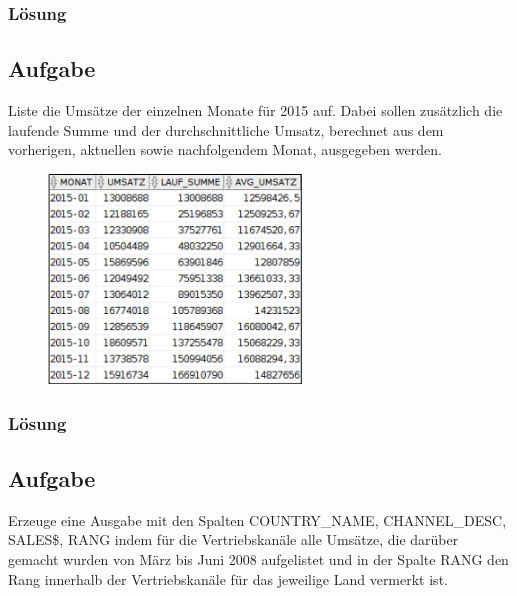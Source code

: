 \subsubsection*{Lösung}
\label{subsubsec:uebung_07.aufgabe_03.loesung}


\label{subsec:uebung_07.aufgabe_04}
\subsection{Aufgabe}
Liste die Umsätze der einzelnen Monate für 2015 auf. Dabei sollen zusätzlich die laufende Summe und der durchschnittliche Umsatz, berechnet aus dem vorherigen, aktuellen sowie nachfolgendem Monat, ausgegeben werden.

\begin{figure}[H]
  \centering
  \includegraphics[width=0.6\textwidth]{img//uebung_07_-_aufgabe_04.png}
  \label{img:uebung_07_-_aufgabe_04}
\end{figure}

\subsubsection*{Lösung}
\label{subsubsec:uebung_07.aufgabe_04.loesung}


\label{subsec:uebung_07.aufgabe_05}
\subsection{Aufgabe}
Erzeuge eine Ausgabe mit den Spalten COUNTRY\_NAME, CHANNEL\_DESC, SALES\$, RANG indem für die Vertriebskanäle alle Umsätze, die darüber gemacht wurden von März bis Juni 2008 aufgelistet und in der Spalte RANG den Rang innerhalb der Vertriebskanäle für das jeweilige Land vermerkt ist.

